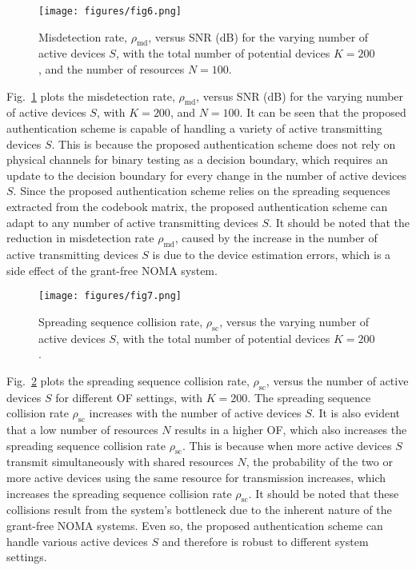 \documentclass[journal,10pt]{IEEEtran}
\begin{document}
\begin{figure}[t] 
\centering
\texttt{[image: figures/fig6.png]}
\caption{Misdetection rate, $\rho_{\mathrm{md}}$, versus SNR (dB) for the varying number of active devices $S$, with the total number of potential devices $K = 200$, and the number of resources $N = 100$.}
\label{misdetectionrate_varyingS}
\end{figure}



Fig.~\ref{misdetectionrate_varyingS} plots the misdetection rate, $\rho_{\mathrm{md}}$, versus SNR (dB) for the varying number of active devices $S$, with $K = 200$, and $N = 100$. It can be seen that the proposed authentication scheme is capable of handling a variety of active transmitting devices $S$. This is because the proposed authentication scheme does not rely on physical channels for binary testing as a decision boundary, which requires an update to the decision boundary for every change in the number of active devices $S$. Since the proposed authentication scheme relies on the spreading sequences extracted from the codebook matrix, the proposed authentication scheme can adapt to any number of active transmitting devices $S$. It should be noted that the reduction in misdetection rate $\rho_{\mathrm{md}}$, caused by the increase in the number of active transmitting devices $S$ is due to the device estimation errors, which is a side effect of the grant-free NOMA system.




\begin{figure}[t] 
\centering
\texttt{[image: figures/fig7.png]}
\caption{Spreading sequence collision rate, $\rho_{\mathrm{sc}}$, versus the varying number of active devices $S$, with the total number of potential devices $K = 200$.}
\label{misdetectionrate_varyingOF}
\end{figure}


Fig.~\ref{misdetectionrate_varyingOF} plots the spreading sequence collision rate, $\rho_{\mathrm{sc}}$, versus the number of active devices $S$ for different OF settings, with $K = 200$. The spreading sequence collision rate $\rho_{\mathrm{sc}}$ increases with the number of active devices $S$. It is also evident that a low number of resources $N$ results in a higher OF, which also increases the spreading sequence collision rate $\rho_{\mathrm{sc}}$. This is because when more active devices $S$ transmit simultaneously with shared resources $N$, the probability of the two or more active devices using the same resource for transmission increases, which increases the spreading sequence collision rate $\rho_{\mathrm{sc}}$. It should be noted that these collisions result from the system's bottleneck due to the inherent nature of the grant-free NOMA systems. Even so, the proposed authentication scheme can handle various active devices $S$ and therefore is robust to different system settings.
\end{document}
